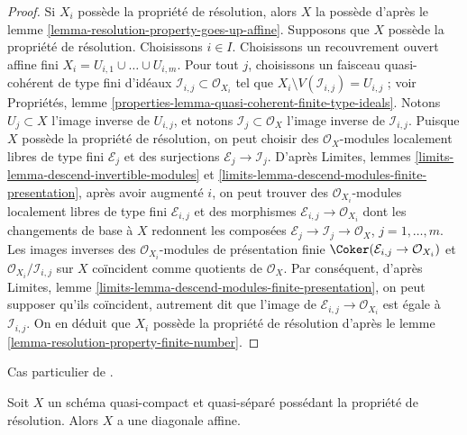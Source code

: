 \begin{proof}
Si $X_i$ possède la propriété de résolution, alors $X$ la possède d'après le
lemme \ref{lemma-resolution-property-goes-up-affine}.
Supposons que $X$ possède la propriété de résolution.
Choisissons $i \in I$. Choisissons un recouvrement ouvert affine fini
$X_i = U_{i, 1} \cup \ldots \cup U_{i, m}$.
Pour tout $j$, choisissons un faisceau quasi-cohérent de type fini
d'idéaux $\mathcal{I}_{i, j} \subset \mathcal{O}_{X_i}$
tel que $X_i \setminus V(\mathcal{I}_{i, j}) = U_{i, j}$ ; voir
Propriétés, lemme \ref{properties-lemma-quasi-coherent-finite-type-ideals}.
Notons $U_j \subset X$ l'image inverse de $U_{i, j}$,
et notons $\mathcal{I}_j \subset \mathcal{O}_X$
l'image inverse de $\mathcal{I}_{i, j}$.
Puisque $X$ possède la propriété de résolution, on peut
choisir des $\mathcal{O}_X$-modules localement libres de type fini $\mathcal{E}_j$
et des surjections $\mathcal{E}_j \to \mathcal{I}_j$.
D'après Limites, lemmes \ref{limits-lemma-descend-invertible-modules} et
\ref{limits-lemma-descend-modules-finite-presentation},
après avoir augmenté $i$, on peut trouver des
$\mathcal{O}_{X_i}$-modules localement libres de type fini $\mathcal{E}_{i, j}$
et des morphismes $\mathcal{E}_{i, j} \to \mathcal{O}_{X_i}$
dont les changements de base à $X$ redonnent les composées
$\mathcal{E}_j \to \mathcal{I}_j \to \mathcal{O}_X$, $j = 1, \ldots, m$.
Les images inverses des $\mathcal{O}_{X_i}$-modules de présentation finie
$\Coker(\mathcal{E}_{i, j} \to \mathcal{O}_{X_i})$
et $\mathcal{O}_{X_i}/\mathcal{I}_{i, j}$
sur $X$ coïncident comme quotients de $\mathcal{O}_X$.
Par conséquent, d'après Limites, lemme
\ref{limits-lemma-descend-modules-finite-presentation},
on peut supposer qu'ils coïncident, autrement dit que
l'image de $\mathcal{E}_{i, j} \to \mathcal{O}_{X_i}$
est égale à $\mathcal{I}_{i, j}$.
On en déduit que $X_i$ possède la propriété de résolution
d'après le lemme \ref{lemma-resolution-property-finite-number}.
\end{proof}

\begin{lemma}
\label{lemma-resolution-property-affine-diagonal}
\begin{reference}
Cas particulier de \cite[Proposition 1.3]{totaro_resolution}.
\end{reference}
Soit $X$ un schéma quasi-compact et quasi-séparé possédant
la propriété de résolution. Alors $X$ a une diagonale affine.
\end{lemma}

